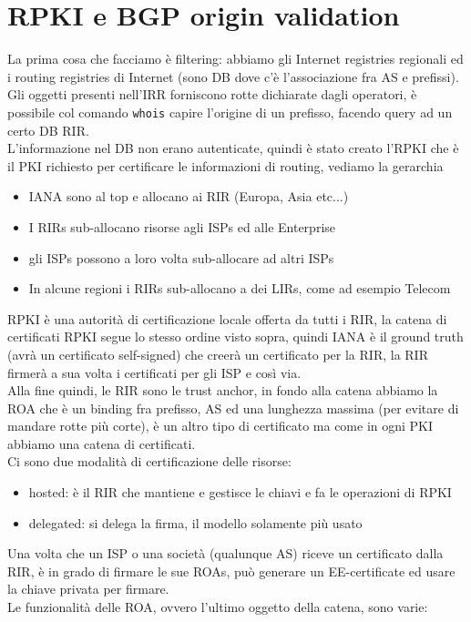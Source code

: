 \documentclass[12pt, oneside]{extbook} %
\begin{document}
\section{RPKI e BGP origin validation}
La prima cosa che facciamo è filtering: abbiamo gli Internet registries regionali ed i routing registries di Internet (sono DB dove c'è l'associazione fra AS e prefissi).
\\Gli oggetti presenti nell'IRR forniscono rotte dichiarate dagli operatori, è possibile col comando \texttt{whois} capire l'origine di un prefisso, facendo query ad un certo DB RIR.
\\L'informazione nel DB non erano autenticate, quindi è stato creato l'RPKI che è il PKI richiesto per certificare le informazioni di routing, vediamo la gerarchia
\begin{itemize}
\item IANA sono al top e allocano ai RIR (Europa, Asia etc...)
\item I RIRs sub-allocano risorse agli ISPs ed alle Enterprise
\item gli ISPs possono a loro volta sub-allocare ad altri ISPs
\item In alcune regioni i RIRs sub-allocano a dei LIRs, come ad esempio Telecom
\end{itemize}
RPKI è una autorità di certificazione locale offerta da tutti i RIR, la catena di certificati RPKI segue lo stesso ordine visto sopra, quindi IANA è il ground truth (avrà un certificato self-signed) che creerà un certificato per la RIR, la RIR firmerà a sua volta i certificati per gli ISP e così via.
\\Alla fine quindi, le RIR sono le trust anchor, in fondo alla catena abbiamo la ROA che è un binding fra prefisso, AS ed una lunghezza massima (per evitare di mandare rotte più corte), è un altro tipo di certificato ma come in ogni PKI abbiamo una catena di certificati.
\\Ci sono due modalità di certificazione delle risorse:
\begin{itemize}
    \item hosted: è il RIR che mantiene e gestisce le chiavi e fa le operazioni di RPKI 
    \item delegated: si delega la firma, il modello solamente più usato
\end{itemize}
Una volta che un ISP o una società (qualunque AS) riceve un certificato dalla RIR, è in grado di firmare le sue ROAs, può generare un EE-certificate ed usare la chiave privata per firmare.
\\Le funzionalità delle ROA, ovvero l'ultimo oggetto della catena, sono varie:
\end{document}
